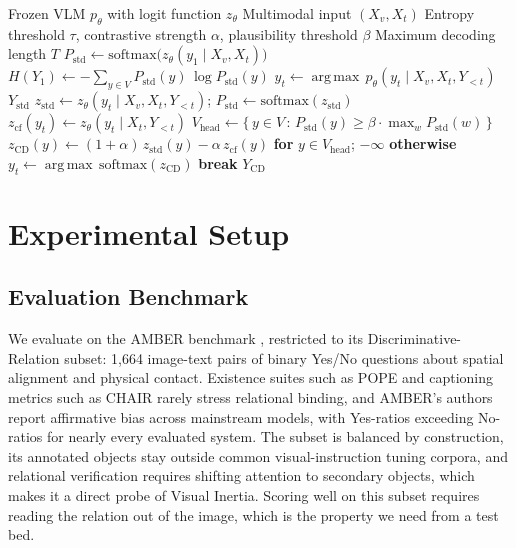 \documentclass[pdflatex,sn-basic,Numbered]{sn-jnl}
\theoremstyle{thmstyleone}
\theoremstyle{thmstyletwo}
\theoremstyle{thmstylethree}
\begin{document}
\begin{algorithm}
\caption{Entropy-Gated Contrastive Decoding (EGCD)}\label{alg:egcd}
\begin{algorithmic}[1]
\Require Frozen VLM $p_{\theta}$ with logit function $z_{\theta}$
\Require Multimodal input $(X_{v}, X_{t})$
\Require Entropy threshold $\tau$, contrastive strength $\alpha$, plausibility threshold $\beta$
\Require Maximum decoding length $T$
\State $P_{\text{std}} \leftarrow \text{softmax}\bigl(z_{\theta}(y_{1} \mid X_{v}, X_{t})\bigr)$
\State $H(Y_{1}) \leftarrow -\sum_{y \in V} P_{\text{std}}(y)\, \log P_{\text{std}}(y)$
    \State $y_{t} \leftarrow \operatorname*{arg\,max}\, p_{\theta}(y_{t} \mid X_{v}, X_{t}, Y_{<t})$
  \EndFor
  \State \Return $Y_{\text{std}}$
\Else
    \State $z_{\text{std}} \leftarrow z_{\theta}(y_{t} \mid X_{v}, X_{t}, Y_{<t})$;\; $P_{\text{std}} \leftarrow \text{softmax}(z_{\text{std}})$
    \State $z_{\text{cf}}(y_{t}) \leftarrow z_{\theta}(y_{t} \mid X_{t}, Y_{<t})$
    \State $V_{\text{head}} \leftarrow \{\, y \in V \,:\, P_{\text{std}}(y) \geq \beta \cdot \max_{w} P_{\text{std}}(w)\,\}$
    \State $z_{\text{CD}}(y) \leftarrow (1 + \alpha)\, z_{\text{std}}(y) - \alpha\, z_{\text{cf}}(y)$ \textbf{for} $y \in V_{\text{head}}$; $-\infty$ \textbf{otherwise}
    \State $y_{t} \leftarrow \operatorname*{arg\,max}\, \text{softmax}(z_{\text{CD}})$
     \textbf{break} \EndIf
  \EndFor
  \State \Return $Y_{\text{CD}}$
\EndIf
\end{algorithmic}
\end{algorithm}

\section{Experimental Setup}\label{sec:experiments}

\subsection{Evaluation Benchmark}\label{subsec:benchmark}

We evaluate on the AMBER benchmark \cite{wang2023amber}, restricted to its Discriminative-Relation subset: 1,664 image-text pairs of binary Yes/No questions about spatial alignment and physical contact. Existence suites such as POPE \cite{li2023bevaluating} and captioning metrics such as CHAIR \cite{rohrbach2018object} rarely stress relational binding, and AMBER's authors report affirmative bias across mainstream models, with Yes-ratios exceeding No-ratios for nearly every evaluated system. The subset is balanced by construction, its annotated objects stay outside common visual-instruction tuning corpora, and relational verification requires shifting attention to secondary objects, which makes it a direct probe of Visual Inertia. Scoring well on this subset requires reading the relation out of the image, which is the property we need from a test bed.
\end{document}
